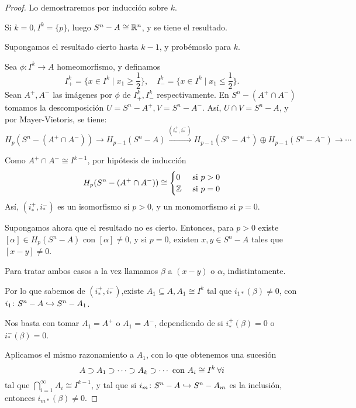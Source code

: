 \begin{proof}
  Lo demostraremos por inducción sobre $k$.

  Si $k = 0, I^k = \{p\}$, luego $S^n - A \cong \mathbb{R}^n$, y se tiene el resultado.

  Supongamos el resultado cierto hasta $k-1$, y probémoslo para $k$.

  Sea $\phi \colon I^k \to A$ homeomorfismo, y definamos
  \[ I_+^k = \{x \in I^k \mid x_1 \geq \frac{1}{2}\}, \quad I_-^k = \{x \in I^k \mid x_1 \leq \frac{1}{2}\}.\]
  Sean $A^+, A^-$ las imágenes por $\phi$ de $I_+^k, I_-^k$ respectivamente.
  En $S^n - (A^+ \cap A^-)$ tomamos la descomposición $U = S^n - A^+, V = S^n - A^-$. Así,
  $U \cap V = S^n - A$, y por Mayer-Vietoris, se tiene:
  \[ H_p(S^n - (A^+ \cap A^-)) \to H_{p-1}(S^n - A) \xrightarrow{(i_*^+, i_*^-)} H_{p-1}(S^n - A^+) \oplus H_{p-1}(S^n - A^-) \to \dotsb \]

  Como $A^+ \cap A^- \cong I^{k-1}$, por hipótesis de inducción \\
  \[H_p(S^n - (A^+ \cap A^-)) \cong \begin{cases} 0 &\text{ si } p > 0 \\
                                                \mathbb{Z} &\text{ si } p = 0 \end{cases}\]
  Así, $(i_*^+, i_*^-)$ es un isomorfismo si $p > 0$, y un monomorfismo si $p = 0$.

  Supongamos ahora que el resultado no es cierto. Entonces, para $p > 0$ existe $[\alpha] \in H_p(S^n - A)$ con $[\alpha] \neq 0$, y
  si $p = 0$, existen $x, y \in S^n - A$ tales que $[x-y] \neq 0$.

  Para tratar ambos casos a la vez llamamos $\beta$ a $(x-y)$ o $\alpha$, indistintamente.

  Por lo que sabemos de $(i_*^+, i_*^-)$,existe $A_1 \subseteq A, A_1 \cong I^k$ tal que
  $i_{1*}(\beta) \neq 0$, con $i_1 \colon S^n - A \xhookrightarrow{} S^n - A_1$.

  Nos basta con tomar $A_1 = A^+$ o $A_1 = A^-$, dependiendo de si $i_*^+(\beta) = 0$ o $i_*^-(\beta) = 0$.

  Aplicamos el mismo razonamiento a $A_1$, con lo que obtenemos una sucesión
  \[ A \supset A_1 \supset \dots \supset A_k \supset \dotsb \text{ con } A_i \cong I^k \hspace{0.2em} \forall i \]
  tal que $\bigcap\limits_{i = 1}^\infty A_i \cong I^{k-1}$, y tal que si $i_m \colon S^n - A \xhookrightarrow{} S^n - A_m$
  es la inclusión, entonces $i_{m*}(\beta) \neq 0$.


\end{proof}
